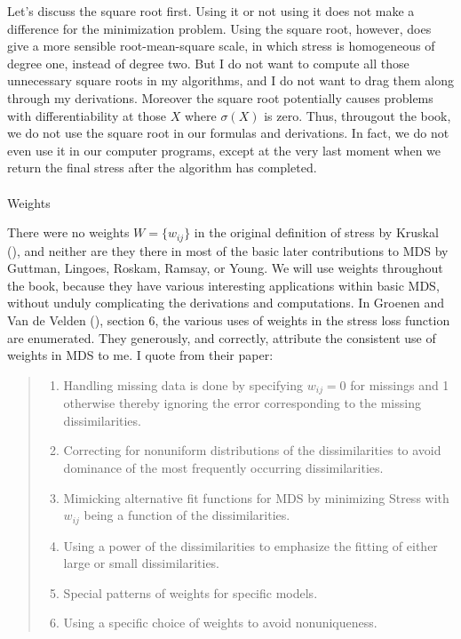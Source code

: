 \documentclass[
  12pt,
  letterpaper,
  DIV=11,
  numbers=noendperiod]{scrartcl}
\makeatletter
\let\oldparagraph\paragraph
\renewcommand{\paragraph}{
    \@ifstar
      \xxxParagraphStar
      \xxxParagraphNoStar
  }
\newcommand{\xxxParagraphStar}[1]{\oldparagraph*{#1}\mbox{}}
\newcommand{\xxxParagraphNoStar}[1]{\oldparagraph{#1}\mbox{}}
\providecommand{\tightlist}{%
  \setlength{\itemsep}{0pt}\setlength{\parskip}{0pt}}\usepackage{longtable,booktabs,array}
\makeatother
\begin{document}
Let's discuss the square root first. Using it or not using it does not
make a difference for the minimization problem. Using the square root,
however, does give a more sensible root-mean-square scale, in which
stress is homogeneous of degree one, instead of degree two. But I do not
want to compute all those unnecessary square roots in my algorithms, and
I do not want to drag them along through my derivations. Moreover the
square root potentially causes problems with differentiability at those
\(X\) where \(\sigma(X)\) is zero. Thus, througout the book, we do not
use the square root in our formulas and derivations. In fact, we do not
even use it in our computer programs, except at the very last moment
when we return the final stress after the algorithm has completed.

\paragraph{Weights}\label{bweights}

There were no weights \(W=\{w_{ij}\}\) in the original definition of
stress by Kruskal (), and neither are
they there in most of the basic later contributions to MDS by Guttman,
Lingoes, Roskam, Ramsay, or Young. We will use weights throughout the
book, because they have various interesting applications within basic
MDS, without unduly complicating the derivations and computations. In
Groenen and Van de Velden (),
section 6, the various uses of weights in the stress loss function are
enumerated. They generously, and correctly, attribute the consistent use
of weights in MDS to me. I quote from their paper:

\begin{quote}
\begin{enumerate}
\def\labelenumi{\arabic{enumi}.}
\tightlist
\item
  Handling missing data is done by specifying \(w_{ij} = 0\) for
  missings and 1 otherwise thereby ignoring the error corresponding to
  the missing dissimilarities.
\item
  Correcting for nonuniform distributions of the dissimilarities to
  avoid dominance of the most frequently occurring dissimilarities.
\item
  Mimicking alternative fit functions for MDS by minimizing Stress with
  \(w_{ij}\) being a function of the dissimilarities.
\item
  Using a power of the dissimilarities to emphasize the ﬁtting of either
  large or small dissimilarities.
\item
  Special patterns of weights for speciﬁc models.
\item
  Using a speciﬁc choice of weights to avoid nonuniqueness.
\end{enumerate}
\end{quote}
\end{document}

